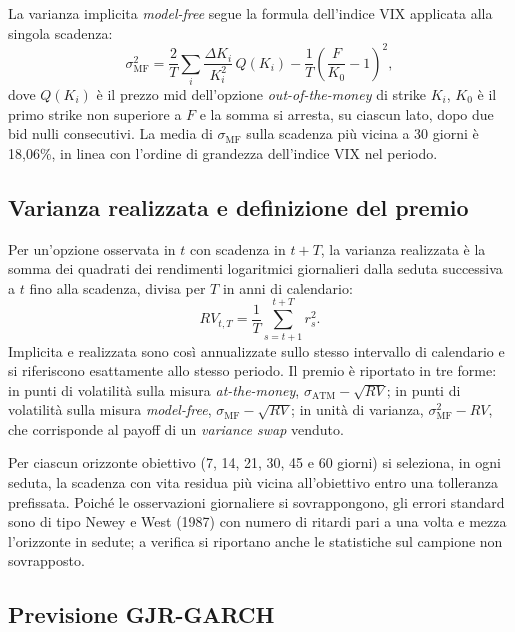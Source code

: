 \documentclass[11pt,a4paper]{article}
\begin{document}
La varianza implicita \emph{model-free} segue la formula dell'indice VIX applicata alla singola scadenza:
\begin{equation}
\sigma^2_{\mathrm{MF}} = \frac{2}{T}\sum_i \frac{\Delta K_i}{K_i^2}\, Q(K_i) - \frac{1}{T}\left(\frac{F}{K_0}-1\right)^2 ,
\end{equation}
dove $Q(K_i)$ è il prezzo mid dell'opzione \emph{out-of-the-money} di strike $K_i$, $K_0$ è il primo strike non superiore a $F$ e la somma si arresta, su ciascun lato, dopo due bid nulli consecutivi. La media di $\sigma_{\mathrm{MF}}$ sulla scadenza più vicina a 30 giorni è 18{,}06\%, in linea con l'ordine di grandezza dell'indice VIX nel periodo.

\subsection{Varianza realizzata e definizione del premio}

Per un'opzione osservata in $t$ con scadenza in $t+T$, la varianza realizzata è la somma dei quadrati dei rendimenti logaritmici giornalieri dalla seduta successiva a $t$ fino alla scadenza, divisa per $T$ in anni di calendario:
\begin{equation}
RV_{t,T} = \frac{1}{T}\sum_{s=t+1}^{t+T} r_s^2 .
\end{equation}
Implicita e realizzata sono così annualizzate sullo stesso intervallo di calendario e si riferiscono esattamente allo stesso periodo. Il premio è riportato in tre forme: in punti di volatilità sulla misura \emph{at-the-money}, $\sigma_{\mathrm{ATM}} - \sqrt{RV}$; in punti di volatilità sulla misura \emph{model-free}, $\sigma_{\mathrm{MF}} - \sqrt{RV}$; in unità di varianza, $\sigma^2_{\mathrm{MF}} - RV$, che corrisponde al payoff di un \emph{variance swap} venduto.

Per ciascun orizzonte obiettivo (7, 14, 21, 30, 45 e 60 giorni) si seleziona, in ogni seduta, la scadenza con vita residua più vicina all'obiettivo entro una tolleranza prefissata. Poiché le osservazioni giornaliere si sovrappongono, gli errori standard sono di tipo Newey e West (1987) con numero di ritardi pari a una volta e mezza l'orizzonte in sedute; a verifica si riportano anche le statistiche sul campione non sovrapposto.

\subsection{Previsione GJR-GARCH}
\end{document}
